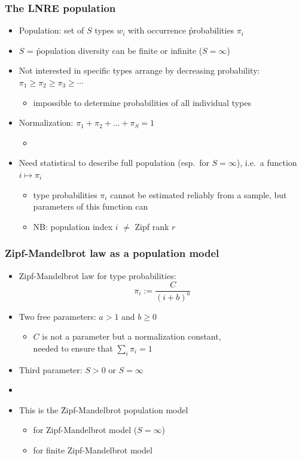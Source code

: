 \documentclass[t]{beamer} %
\begin{document}
\begin{frame}
  \frametitle{The LNRE population}

  \begin{itemize}
  \item Population: set of $S$ types $w_i$ with occurrence \h{probabilities} $\pi_i$
  \item $S$ = \h{population diversity} can be finite or infinite ($S = \infty$)
  \item Not interested in specific types \so  arrange by decreasing
    probability: $\pi_1\geq \pi_2\geq \pi_3 \geq \cdots$
    \begin{itemize}
    \item[\hand] impossible to determine probabilities of all individual types
    \end{itemize}
  \item Normalization: $\pi_1 + \pi_2 + \ldots + \pi_S = 1$
    \begin{itemize}
    \item[]
    \end{itemize}
  \item Need  statistical  to describe full population (esp.\ for $S = \infty$),
    i.e.\ a function $i \mapsto \pi_i$
    \begin{itemize}
    \item type probabilities $\pi_i$ cannot be estimated reliably from a sample, but parameters of this function can
    \item NB: population index $i$ $\neq$ Zipf rank $r$
    \end{itemize}
  \end{itemize}
\end{frame}

\begin{frame}
  \frametitle{Zipf-Mandelbrot law as a population model}

  \begin{itemize}
  \item Zipf-Mandelbrot law for type probabilities:
    \[ \pi_i := \frac{C}{(i + b) ^ a} \]
  \item Two free parameters: $a > 1$ and $b \geq 0$
    \begin{itemize}
    \item[\hand] $C$ is not a parameter but a normalization constant,\\
      needed to ensure that $\sum_i \pi_i = 1$
    \end{itemize}
  \item Third parameter: $S > 0$ or $S = \infty$
  \item[]
  \item This is the \h{Zipf-Mandelbrot} population model \citep{Evert:04}
    \begin{itemize}
    \item {} for Zipf-Mandelbrot model ($S = \infty$)
    \item {} for finite Zipf-Mandelbrot model
    \end{itemize}
  \end{itemize}
\end{frame}
\end{document}
